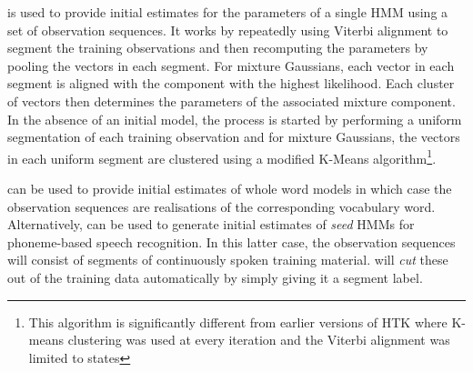 %
%

\newpage
{}


 is used to provide initial estimates for the parameters
of a single HMM using a set of observation sequences.
It works by repeatedly using Viterbi alignment to segment the
training observations and then recomputing the parameters
by pooling the vectors in each segment.   For mixture Gaussians, each
vector in each segment is aligned with the component with the highest
likelihood.   Each cluster of vectors then determines the parameters
of the associated mixture component.
In the absence of an initial model, the process
is started by performing a uniform 
segmentation of each training observation and for mixture Gaussians,
the vectors in each uniform segment are clustered using a modified K-Means 
algorithm\footnote{This algorithm is significantly different from 
earlier versions of HTK where K-means clustering was used at every
iteration and the Viterbi alignment was limited to states}. 

 can be used to provide initial estimates of whole word models
in which case the observation sequences are realisations of the 
corresponding vocabulary word.
Alternatively,  can be used to generate initial estimates of
{\em seed} HMMs for phoneme-based speech recognition.
In this latter case, the observation sequences will consist
of segments of continuously spoken training material.   will
{\it cut} these out of the training data automatically by simply
giving it a segment label.

